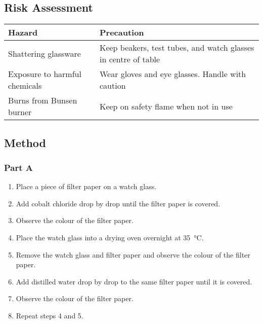 	\subsection{Risk Assessment}
		\begin{table}[H]
			\centering
			\begin{tabular}{ll}
				\hline
				Hazard & Precaution \\ \hline
				Shattering glassware & Keep beakers, test tubes, and watch glasses in centre of table \\
				Exposure to harmful chemicals & Wear gloves and eye glasses. Handle with caution \\
				Burns from Bunsen burner & Keep on safety flame when not in use
			\end{tabular}
		\end{table}

	\subsection{Method}
		\subsubsection{Part A}
			\begin{enumerate}
				\item Place a piece of filter paper on a watch glass.
				\item Add cobalt chloride drop by drop until the filter paper is covered.
				\item Observe the colour of the filter paper.
				\item Place the watch glass into a drying oven overnight at \qty{35}{\degreeCelsius}.
				\item Remove the watch glass and filter paper and observe the colour of the filter paper.
				\item Add distilled water drop by drop to the same filter paper until it is covered.
				\item Observe the colour of the filter paper.
				\item Repeat steps 4 and 5.
			\end{enumerate}
		
